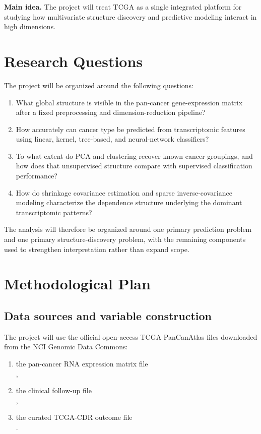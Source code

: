 \documentclass[12pt]{article}
\newcommand{\1}{\mathbf{1}}
\begin{document}
\begin{keybox}
\textbf{Main idea.}
The project will treat TCGA as a single integrated platform for studying how multivariate structure discovery and predictive modeling interact in high dimensions.
\end{keybox}

\section{Research Questions}

The project will be organized around the following questions:

\begin{enumerate}
    \item What global structure is visible in the pan-cancer gene-expression matrix after a fixed preprocessing and dimension-reduction pipeline?
    \item How accurately can cancer type be predicted from transcriptomic features using linear, kernel, tree-based, and neural-network classifiers?
    \item To what extent do PCA and clustering recover known cancer groupings, and how does that unsupervised structure compare with supervised classification performance?
    \item How do shrinkage covariance estimation and sparse inverse-covariance modeling characterize the dependence structure underlying the dominant transcriptomic patterns?
\end{enumerate}

The analysis will therefore be organized around one primary prediction problem and one primary structure-discovery problem, with the remaining components used to strengthen interpretation rather than expand scope.

\section{Methodological Plan}

\subsection{Data sources and variable construction}

The project will use the official open-access TCGA PanCanAtlas files downloaded from the NCI Genomic Data Commons:
\begin{enumerate}
    \item the pan-cancer RNA expression matrix file\\
    ,
    \item the clinical follow-up file\\
    ,
    \item the curated TCGA-CDR outcome file\\
    .
\end{enumerate}
\end{document}
